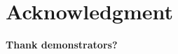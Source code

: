 \documentclass[journal]{Imperial_lab_report}
\begin{document}
\section*{Acknowledgment}

\textbf{Thank demonstrators? }


\ifCLASSOPTIONcaptionsoff
  \newpage
\fi





%
%
%
 
%
\end{document}
